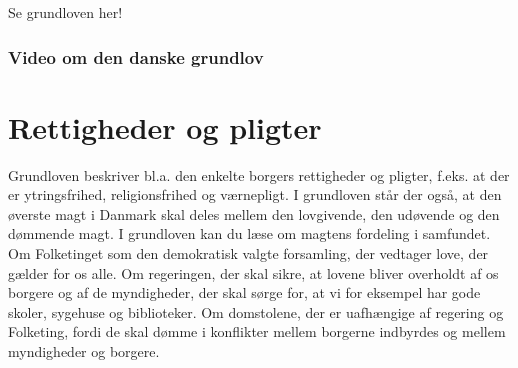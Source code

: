 \documentclass[]{book}
\begin{document}
Se grundloven her!

\hypertarget{video-om-den-danske-grundlov}{%
\subsubsection{Video om den danske grundlov}\label{video-om-den-danske-grundlov}}

\hypertarget{rettigheder-og-pligter}{%
\section{Rettigheder og pligter}\label{rettigheder-og-pligter}}

Grundloven beskriver bl.a. den enkelte borgers rettigheder og pligter, f.eks. at der er ytringsfrihed, religionsfrihed og værnepligt. I grundloven står der også, at den øverste magt i Danmark skal deles mellem den lovgivende, den udøvende og den dømmende magt.
I grundloven kan du læse om magtens fordeling i samfundet. Om Folketinget som den demokratisk valgte forsamling, der vedtager love, der gælder for os alle. Om regeringen, der skal sikre, at lovene bliver overholdt af os borgere og af de myndigheder, der skal sørge for, at vi for eksempel har gode skoler, sygehuse og biblioteker. Om domstolene, der er uafhængige af regering og Folketing, fordi de skal dømme i konflikter mellem borgerne indbyrdes og mellem myndigheder og borgere.
\end{document}
